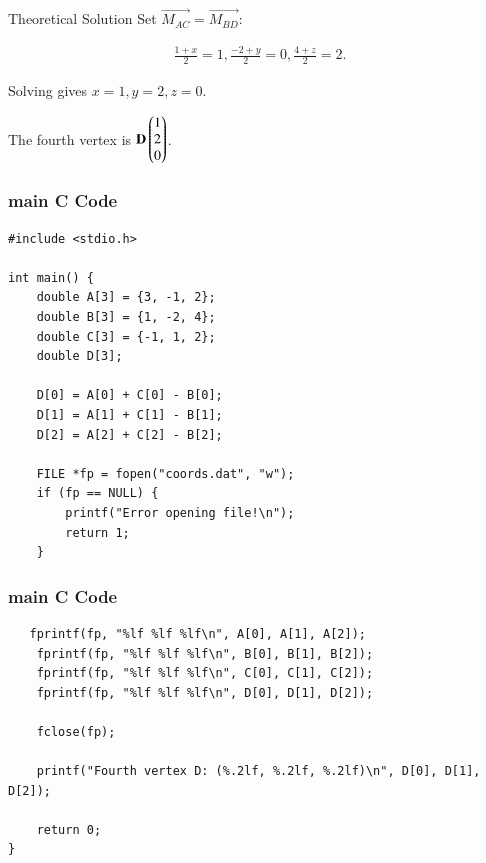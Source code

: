 \documentclass{beamer}
\begin{document}
\begin{frame}{Theoretical Solution}
Set $\vec{M_{AC}}=\vec{M_{BD}}$:

\begin{align}
\frac{1+x}{2}=1, \frac{-2+y}{2}=0, \frac{4+z}{2}=2.
\end{align}

Solving gives $x=1, y=2, z=0$.

The fourth vertex is $\mathbf{D}\begin{pmatrix}1\\2\\0\end{pmatrix}$.
\end{frame}


\begin{frame}[fragile]
    \frametitle{main C Code}

    \begin{lstlisting}
#include <stdio.h>

int main() {
    double A[3] = {3, -1, 2};
    double B[3] = {1, -2, 4};
    double C[3] = {-1, 1, 2};
    double D[3];

    D[0] = A[0] + C[0] - B[0];
    D[1] = A[1] + C[1] - B[1];
    D[2] = A[2] + C[2] - B[2];

    FILE *fp = fopen("coords.dat", "w");
    if (fp == NULL) {
        printf("Error opening file!\n");
        return 1;
    }
    \end{lstlisting}
\end{frame}

\begin{frame}[fragile]
    \frametitle{main C Code}

    \begin{lstlisting}
   fprintf(fp, "%lf %lf %lf\n", A[0], A[1], A[2]);
    fprintf(fp, "%lf %lf %lf\n", B[0], B[1], B[2]);
    fprintf(fp, "%lf %lf %lf\n", C[0], C[1], C[2]);
    fprintf(fp, "%lf %lf %lf\n", D[0], D[1], D[2]);

    fclose(fp);

    printf("Fourth vertex D: (%.2lf, %.2lf, %.2lf)\n", D[0], D[1], D[2]);

    return 0;
}
    \end{lstlisting}
\end{frame}
\end{document}
